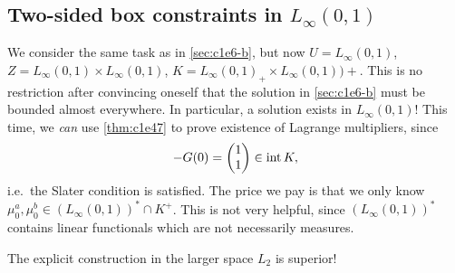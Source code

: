 \documentclass[../skript.tex]{subfiles}
\begin{document}
\subsection{Two-sided box constraints in \texorpdfstring{$L_\infty(0, 1)$}{L∞(0, 1)}} %
\label{sec:c1e6-c}
We consider the same task as in \cref{sec:c1e6-b}, but now $U = L_\infty(0, 1)$, $Z = L_\infty(0, 1) \times L_\infty(0, 1)$, $K = L_\infty(0, 1)_+ \times L_\infty(0, 1))+$.
This is no restriction after convincing oneself that the solution in \cref{sec:c1e6-b} must be bounded almost everywhere.
In particular, a solution exists in $L_\infty(0, 1)$!
This time, we \emph{can} use \cref{thm:c1e47} to prove existence of Lagrange multipliers, since
\[
	-G(0) = \begin{pmatrix}
	1 \\ 1
	\end{pmatrix} \in \operatorname{int} K,
\]
i.e.~the Slater condition is satisfied.
The price we pay is that we only know $\mu_0^a, \mu_0^b \in (L_\infty(0, 1))^* \cap K^+$. This is not very helpful, since $(L_\infty(0, 1))^*$ contains linear functionals which are not necessarily measures.

The explicit construction in the larger space $L_2$ is superior!
\end{document}
